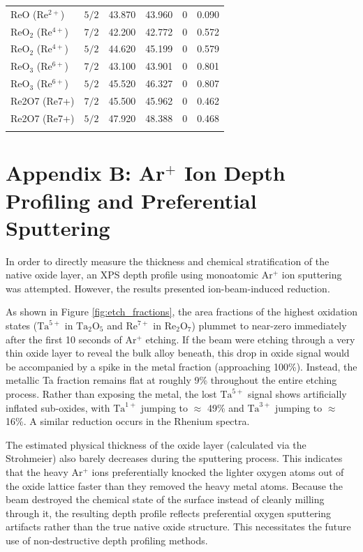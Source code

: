 \documentclass[12pt]{article}
\begin{document}
\begin{table}[H]
\begin{threeparttable}
\begin{tabular}{llrrrr}
$\mathrm{ReO}$ ($\mathrm{Re^{2+}}$) & $5/2$ & 43.870 & 43.960 & 0 & 0.090 \\
$\mathrm{ReO_2}$ ($\mathrm{Re^{4+}}$) & $7/2$ & 42.200 & 42.772 & 0 & 0.572 \\
$\mathrm{ReO_2}$ ($\mathrm{Re^{4+}}$) & $5/2$ & 44.620 & 45.199 & 0 & 0.579 \\
$\mathrm{ReO_3}$ ($\mathrm{Re^{6+}}$) & $7/2$ & 43.100 & 43.901 & 0 & 0.801 \\
$\mathrm{ReO_3}$ ($\mathrm{Re^{6+}}$) & $5/2$ & 45.520 & 46.327 & 0 & 0.807 \\
Re2O7 (Re7+) & $7/2$ & 45.500 & 45.962 & 0 & 0.462 \\
Re2O7 (Re7+) & $5/2$ & 47.920 & 48.388 & 0 & 0.468 \\
\addlinespace
\bottomrule
\end{tabular}
\end{threeparttable}
\end{table}

\newpage
{}
\section*{Appendix B: Ar$^+$ Ion Depth Profiling and Preferential Sputtering}
In order to directly measure the thickness and chemical stratification of the native oxide layer, an XPS depth profile using monoatomic Ar$^+$ ion sputtering was attempted. However, the results presented ion-beam-induced reduction. 

As shown in Figure \ref{fig:etch_fractions}, the area fractions of the highest oxidation states ($\mathrm{Ta}^{5+}$ in $\mathrm{Ta_2O_5}$ and $\mathrm{Re}^{7+}$ in $\mathrm{Re_2O_7}$) plummet to near-zero immediately after the first 10 seconds of Ar$^+$ etching. If the beam were etching through a very thin oxide layer to reveal the bulk alloy beneath, this drop in oxide signal would be accompanied by a spike in the metal fraction (approaching 100\%). Instead, the metallic Ta fraction remains flat at roughly 9\% throughout the entire etching process. Rather than exposing the metal, the lost $\mathrm{Ta}^{5+}$ signal shows artificially inflated sub-oxides, with $\mathrm{Ta}^{1+}$ jumping to $\approx$ 49\% and $\mathrm{Ta}^{3+}$ jumping to $\approx$ 16\%. A similar reduction occurs in the Rhenium spectra. 

The estimated physical thickness of the oxide layer (calculated via the Strohmeier) also barely decreases during the sputtering process. This indicates that the heavy Ar$^+$ ions preferentially knocked the lighter oxygen atoms out of the oxide lattice faster than they removed the heavy metal atoms. Because the beam destroyed the chemical state of the surface instead of cleanly milling through it, the resulting depth profile reflects preferential oxygen sputtering artifacts rather than the true native oxide structure. This necessitates the future use of non-destructive depth profiling methods.
\end{document}
